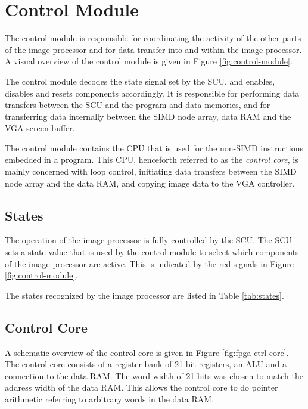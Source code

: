 \section{Control Module}

The control module is responsible for coordinating the activity of the
other parts of the image processor and for data transfer into and within
the image processor. A visual overview of the control module is given in
Figure \ref{fig:control-module}.



The control module decodes the state signal set by the SCU, and enables,
disables and resets components accordingly. It is responsible for performing
data transfers between the SCU and the program and data memories, and for
transferring data internally between the \ac{SIMD} node array, data \ac{RAM}
and the \ac{VGA} screen buffer. 

The control module contains the \ac{CPU} that is used for the non-\ac{SIMD}
instructions embedded in a program. This \ac{CPU}, henceforth referred to as the
\emph{control core}, is mainly concerned with loop control, initiating data
transfers between the \ac{SIMD} node array and the data RAM, and copying image
data to the \ac{VGA} controller.

\subsection{States}

The operation of the image processor is fully controlled by the \ac{SCU}. The
\ac{SCU} sets a state value that is used by the control module to select which
components of the image processor are active. This is indicated by the red
signals in Figure
\ref{fig:control-module}.

The states recognized by the image processor are listed in Table
\ref{tab:states}.



\subsection{Control Core}

A schematic overview of the control core is given in Figure
\ref{fig:fpga-ctrl-core}. The control core consists of a register bank
of 21 bit registers, an \ac{ALU} and a connection to the data \ac{RAM}. The word
width of 21 bits was chosen to match the address width of the data \ac{RAM}.
This allows the control core to do pointer arithmetic referring to
arbitrary words in the data \ac{RAM}.

